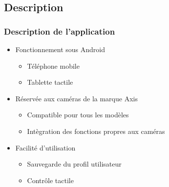 \documentclass{beamer}
\begin{document}
  \subsection{Description}
  \begin{frame}
   \frametitle{Description de l'application}
   \begin{itemize}
   \item Fonctionnement sous Android
       \begin{itemize}
    	\item Téléphone mobile
   		\item Tablette tactile
    	\end{itemize}
   \item Réservée aux caméras de la marque Axis
   		\begin{itemize}
    	\item Compatible pour tous les modèles
   		\item Intègration des fonctions propres aux caméras
    	\end{itemize}
   \item Facilité d'utilisation
   		\begin{itemize}
    	\item Sauvegarde du profil utilisateur
   		\item Contrôle tactile
    	\end{itemize}
   \end{itemize}
  \end{frame}
















\end{document}
